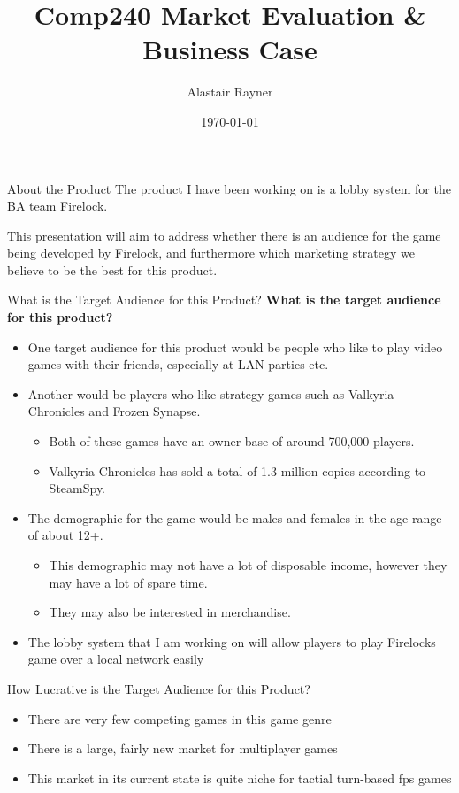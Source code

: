 \documentclass{beamer}
\title{Comp240 Market Evaluation \& Business Case}
\author{Alastair Rayner}
\date{\today}
\begin{document}
\maketitle


\begin{frame}{About the Product}
	The product I have been working on is a lobby system for the BA team Firelock. \pause
	
	This presentation will aim to address whether there is an audience for the game being developed by Firelock, and furthermore which marketing strategy we believe to be the best for this product. \pause
\end{frame}


\begin{frame}{What is the Target Audience for this Product?}		
	\textbf{What is the target audience for this product?} \pause
		\begin{itemize}
			\item One target audience for this product would be people who like to play video games with their friends, especially at LAN parties etc. \pause
			\item Another would be players who like strategy games such as Valkyria Chronicles and Frozen Synapse. \pause
			
				\begin{itemize}
					\item Both of these games have an owner base of around 700,000 players. \pause
					\item Valkyria Chronicles has sold a total of 1.3 million copies according to SteamSpy. \pause
				\end{itemize}	
			\item The demographic for the game would be males and females in the age range of about 12+.  \pause
				\begin{itemize}
					\item This demographic may not have a lot of disposable income, however they may have a lot of spare time. \pause
					\item They may also be interested in merchandise. \pause
				\end{itemize}
			\item The lobby system that I am working on will allow players to play Firelocks game over a local network easily \pause 	
		\end{itemize}
\end{frame}

\begin{frame}{How Lucrative is the Target Audience for this Product?}
	\begin{itemize}
		\item There are very few competing games in this game genre \pause
		\item There is a large, fairly new market for multiplayer games \pause
		\item This market in its current state is quite niche for tactial turn-based fps games \pause
		
	\end{itemize}
\end{frame}
\end{document}
